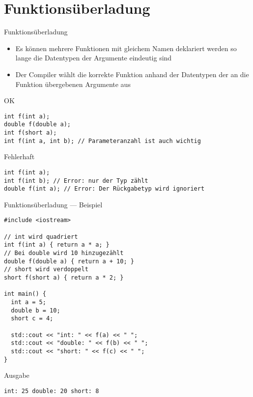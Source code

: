 \documentclass[presentation]{beamer}
\begin{document}
\section{Funktionsüberladung}
\label{sec:org8bb06e9}
\begin{frame}[label={sec:org4928a9a},fragile]{Funktionsüberladung}
 \begin{itemize}
\item Es können mehrere Funktionen mit \alert{gleichem Namen} deklariert werden
so lange die \alert{Datentypen der Argumente eindeutig} sind
\item Der \alert{Compiler wählt die korrekte Funktion} anhand der Datentypen der
an die Funktion übergebenen Argumente aus
\end{itemize}
\begin{block}{OK}
\begin{verbatim}
int f(int a);
double f(double a);
int f(short a);
int f(int a, int b); // Parameteranzahl ist auch wichtig
\end{verbatim}
\end{block}
\begin{block}{Fehlerhaft}
\begin{verbatim}
int f(int a);
int f(int b); // Error: nur der Typ zählt
double f(int a); // Error: Der Rückgabetyp wird ignoriert
\end{verbatim}
\end{block}
\end{frame}
\begin{frame}[label={sec:org8a949fe},fragile]{Funktionsüberladung --- Beispiel}
 \begin{verbatim}
#include <iostream>

// int wird quadriert
int f(int a) { return a * a; }
// Bei double wird 10 hinzugezählt
double f(double a) { return a + 10; }
// short wird verdoppelt
short f(short a) { return a * 2; }

int main() {
  int a = 5;
  double b = 10;
  short c = 4;

  std::cout << "int: " << f(a) << " ";
  std::cout << "double: " << f(b) << " ";
  std::cout << "short: " << f(c) << " ";
}
\end{verbatim}
\begin{block}{Ausgabe}
\begin{verbatim}
int: 25 double: 20 short: 8
\end{verbatim}
\end{block}
\end{frame}
\end{document}
